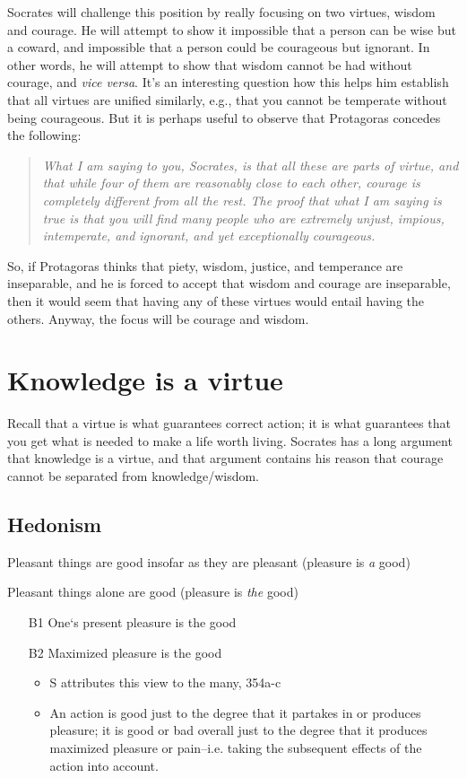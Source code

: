 \documentclass[oneside]{article}
\begin{document}
Socrates will challenge this position by really focusing on two virtues, wisdom and courage. He will attempt to show it impossible that a person can be wise but a coward, and impossible that a person could be courageous but ignorant. In other words, he will attempt to show that wisdom cannot be had without courage, and \emph{vice versa}. It's an interesting question how this helps him establish that all virtues are unified similarly, e.g., that you cannot be temperate without being courageous. But it is perhaps useful to observe that Protagoras concedes the following: 
\begin{quote}
\emph{What I am saying to you, Socrates, is that all these are parts of virtue, and that while four of them are reasonably close to each other, courage is completely different from all the rest. The proof that what I am saying is true is that you will find many people who are extremely unjust, impious, intemperate, and ignorant, and yet exceptionally courageous.}
\end{quote}
So, if Protagoras thinks that piety, wisdom, justice, and temperance are inseparable, and he is forced to accept that wisdom and courage are inseparable, then it would seem that having any of these virtues would entail having the others. Anyway, the focus will be courage and wisdom. 

\section*{Knowledge is a virtue}
Recall that a virtue is what guarantees correct action; it is what guarantees that you get what is needed to make a life worth living. Socrates has a long argument that knowledge is a virtue, and that argument contains his reason that courage cannot be separated from knowledge/wisdom. 


\subsection*{Hedonism}

\noindent [A] Pleasant things are good insofar as they are pleasant (pleasure is \emph{a} good)
\vspace*{2mm}

\noindent [B] Pleasant things alone are good (pleasure is \emph{the} good)

\begin{itemize}
\item[B1]  One`s present pleasure is the good
\item[B2]  Maximized pleasure is the good
\begin{itemize}
\item S attributes this view to the many, 354a-c
\item An action is good just to the degree that it partakes in or produces pleasure; it is good or bad overall just to the degree that it produces maximized pleasure or pain--i.e. taking the subsequent effects of the action into account.
\end{itemize}
\end{itemize}
\end{document}
